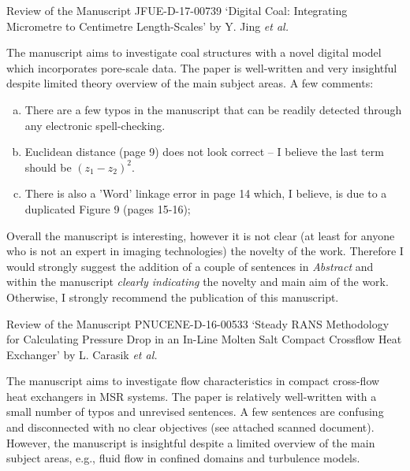 \documentclass[14pt,twoside]{report}
\begin{document}
{
  } 


\clearpage




\begin{center}
  {\Large Review of the Manuscript JFUE-D-17-00739 `Digital Coal: Integrating Micrometre to Centimetre Length-Scales' by Y. Jing {\it et al.}}
\end{center}

\medskip
The manuscript aims to investigate coal structures with a novel digital model which incorporates pore-scale data. The paper is well-written and very insightful despite limited theory overview of the main subject areas. A few comments:
\begin{enumerate}[(a)]
    \item There are a few typos in the manuscript that can be readily detected through any electronic spell-checking.
    \item Euclidean distance (page 9) does not look correct -- I believe the last term should be $\left(z_{1}-z_{2}\right)^{2}$.
    \item There is also a 'Word' linkage error in page 14 which, I believe, is due to a duplicated Figure 9 (pages 15-16);
\end{enumerate}
Overall the manuscript is interesting, however it is not clear (at least for anyone who is not an expert in imaging technologies) the novelty of the work. Therefore I would strongly suggest the addition of a couple of sentences in {\it Abstract} and within the manuscript {\it clearly indicating} the novelty and main aim of the work. Otherwise, I strongly recommend the publication of this manuscript. 
\medskip
{
  }


\clearpage




\begin{center}
  {\Large Review of the Manuscript PNUCENE-D-16-00533 `Steady RANS Methodology for Calculating Pressure Drop in an In-Line Molten Salt Compact Crossflow Heat Exchanger' by L. Carasik {\it et al.}}
\end{center}

\medskip
The manuscript aims to investigate flow characteristics in compact cross-flow heat exchangers in MSR systems. The paper is relatively well-written with a small number of typos and unrevised sentences. A few sentences are confusing and disconnected with no clear objectives (see attached scanned document).  However, the manuscript is insightful despite a limited overview of the main subject areas, e.g., fluid flow in confined domains and turbulence models.
\end{document}

